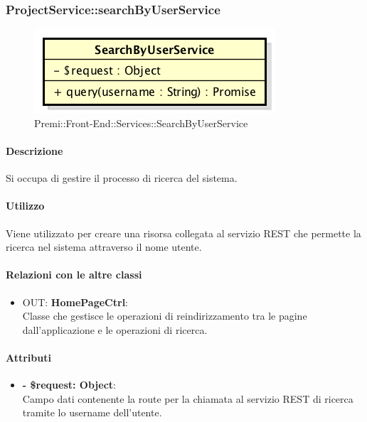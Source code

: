		
		\subsubsection{ProjectService::searchByUserService}
		\begin{figure}[h]
			\centering
				\includegraphics[width=0.4\linewidth]{img/premi_front_end_services_searchbyuserservice}
			\caption[Premi::Front-End::Services::SearchByUserService]{Premi::Front-End::Services::SearchByUserService}
		\end{figure}
		
		\paragraph{Descrizione}
		Si occupa di gestire il processo di ricerca del sistema.
		
		\paragraph{Utilizzo}
		Viene utilizzato per creare una risorsa collegata al servizio \gls{REST} che permette la ricerca nel sistema attraverso il nome utente.
		
		\paragraph{Relazioni con le altre classi}
		\begin{itemize}
			\item OUT: \textbf{HomePageCtrl}:\\
			Classe che gestisce le operazioni di reindirizzamento tra le pagine dall'applicazione e le operazioni di ricerca.
		\end{itemize}
		
		\paragraph{Attributi}
		\begin{itemize}
			\item \textbf{- \$request: Object}:\\
			Campo dati contenente la route per la chiamata al servizio \gls{REST} di ricerca tramite lo username dell'utente.
		\end{itemize}	
		
